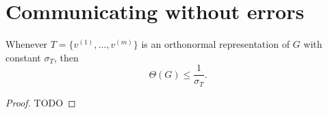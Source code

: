 \chapter{Communicating without errors}

\begin{theorem}
  \label{ch42theorem}
  Whenever $T = \{v^{(1)}, \dots, v^{(m)}\}$ is an orthonormal representation of $G$ with constant $\sigma_T$, then
\[
\Theta(G) \leq \frac{1}{\sigma_T}.
\]
\end{theorem}
\begin{proof}
  TODO
\end{proof}

